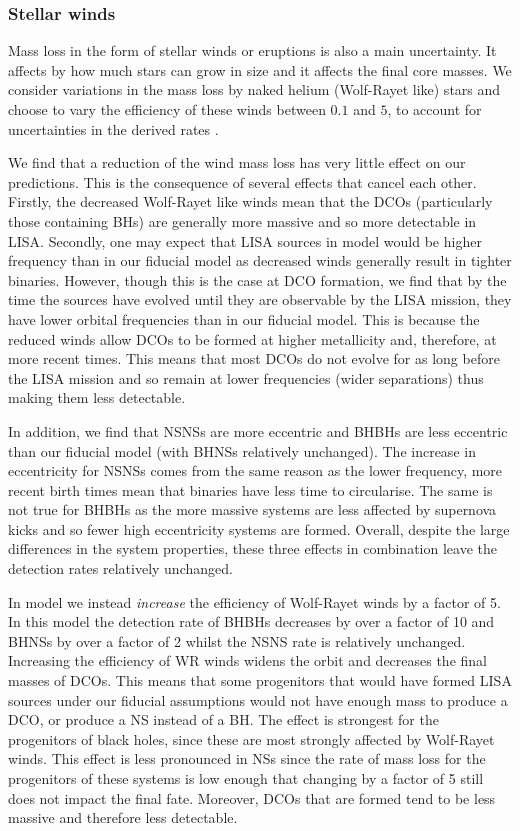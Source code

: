 \subsubsection{Stellar winds}
Mass loss in the form of stellar winds or eruptions is also a main uncertainty. It affects by how much stars can grow in size and it affects the final core masses. We consider variations in the mass loss by naked helium (Wolf-Rayet like) stars and choose to vary the efficiency of these winds between $0.1$ and $5$, to account for uncertainties in the derived rates \citep[e.g.][]{Vink+2017, Shenar+2019, Hamann+2019, Sander+2020}.

We find that a reduction of the wind mass loss has very little effect on our predictions. This is the consequence of several effects that cancel each other. Firstly, the decreased Wolf-Rayet like winds mean that the DCOs (particularly those containing BHs) are generally more massive and so more detectable in LISA. Secondly, one may expect that LISA sources in model \modWRLow{} would be higher frequency than in our fiducial model as decreased winds generally result in tighter binaries. However, though this is the case at DCO formation, we find that by the time the sources have evolved until they are observable by the LISA mission, they have lower orbital frequencies than in our fiducial model. This is because the reduced winds allow DCOs to be formed at higher metallicity and, therefore, at more recent times. This means that most DCOs do not evolve for as long before the LISA mission and so remain at lower frequencies (wider separations) thus making them less detectable.

In addition, we find that NSNSs are more eccentric and BHBHs are less eccentric than our fiducial model (with BHNSs relatively unchanged). The increase in eccentricity for NSNSs comes from the same reason as the lower frequency, more recent birth times mean that binaries have less time to circularise. The same is not true for BHBHs as the more massive systems are less affected by supernova kicks and so fewer high eccentricity systems are formed. Overall, despite the large differences in the system properties, these three effects in combination leave the detection rates relatively unchanged.

In model \modWRHigh{} we instead \textit{increase} the efficiency of Wolf-Rayet winds by a factor of 5. In this model the detection rate of BHBHs decreases by over a factor of 10 and BHNSs by over a factor of 2 whilst the NSNS rate is relatively unchanged. Increasing the efficiency of WR winds widens the orbit and decreases the final masses of DCOs. This means that some progenitors that would have formed LISA sources under our fiducial assumptions would not have enough mass to produce a DCO, or produce a NS instead of a BH. The effect is strongest for the progenitors of black holes, since these are most strongly affected by Wolf-Rayet winds. This effect is less pronounced in NSs since the rate of mass loss for the progenitors of these systems is low enough that changing by a factor of 5 still does not impact the final fate. Moreover, DCOs that are formed tend to be less massive and therefore less detectable. 

